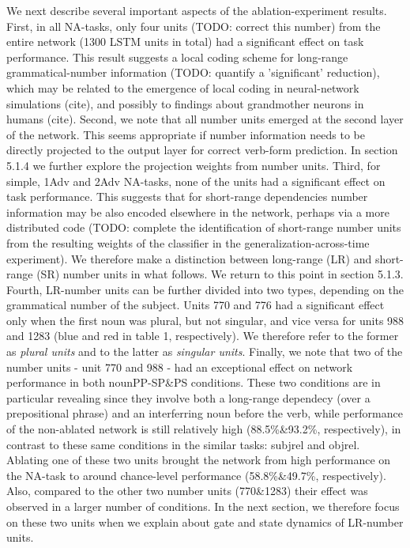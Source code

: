 We next describe several important aspects of the ablation-experiment results. First, in all NA-tasks, only four units (TODO: correct this number) from the entire network (1300 LSTM units in total) had a significant effect on task performance. This result suggests a local coding scheme for long-range grammatical-number information (TODO: quantify a 'significant' reduction), which may be related to the emergence of local coding in neural-network simulations (cite), and possibly to findings about grandmother neurons in humans (cite). Second, we note that all number units emerged at the second layer of the network. This seems appropriate if number information needs to be directly projected to the output layer for correct verb-form prediction. In section 5.1.4 we further explore the projection weights from number units. Third, for simple, 1Adv and 2Adv NA-tasks, none of the units had a significant effect on task performance. This suggests that for short-range dependencies number information may be also encoded elsewhere in the network, perhaps via a more distributed code (TODO: complete the identification of short-range number units from the resulting weights of the classifier in the generalization-across-time experiment). We therefore make a distinction between long-range (LR) and short-range (SR) number units in what follows. We return to this point in section 5.1.3. Fourth, LR-number units can be further divided into two types, depending on the grammatical number of the subject. Units 770 and 776 had a significant effect only when the first noun was plural, but not singular, and vice versa for units 988 and 1283 (blue and red in table 1, respectively). We therefore refer to the former as \textit{plural units} and to the latter as \textit{singular units}. Finally, we note that two of the number units - unit 770 and 988 - had an exceptional effect on network performance in both nounPP-SP\&PS conditions. These two conditions are in particular revealing since they involve both a long-range dependecy (over a prepositional phrase) and an interferring noun before the verb, while performance of the non-ablated network is still relatively high (88.5\%\&93.2\%, respectively), in contrast to these same conditions in the similar tasks: subjrel and objrel. Ablating one of these two units brought the network from high performance on the NA-task to around chance-level performance (58.8\%\&49.7\%, respectively). Also, compared to the other two number units (770\&1283) their effect was observed in a larger number of conditions. In the next section, we therefore focus on these two units when we explain about gate and state dynamics of LR-number units.

